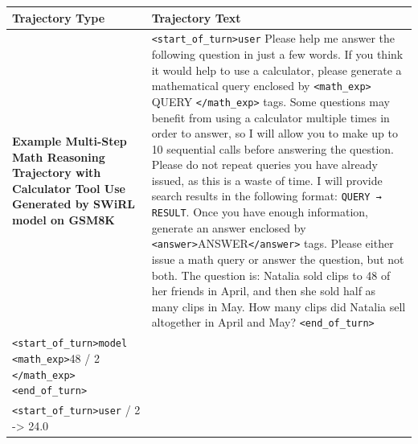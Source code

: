 \documentclass{article} %
\begin{document}
\begin{table}[h!]
    \centering
    \small %
    \begin{tabular}{|p{5cm}|p{8cm}|} %
        \hline
        \textbf{Trajectory Type} & \textbf{Trajectory Text} \\
        \hline
        \textbf{Example Multi-Step Math Reasoning Trajectory with Calculator Tool Use Generated by SWiRL model on GSM8K} & 
        \raggedright 
        \texttt{\textless start\_of\_turn\textgreater user} \newline
        Please help me answer the following question in just a few words. If you think it would help to use a calculator, please generate a mathematical query enclosed by  \texttt{\textless math\_exp\textgreater} QUERY \texttt{\textless /math\_exp\textgreater} tags. \newline
        Some questions may benefit from using a calculator multiple times in order to answer, so I will allow you to make up to 10 sequential calls before answering the question.\newline
        Please do not repeat queries you have already issued, as this is a waste of time. \newline
        I will provide search results in the following format: \newline
        \texttt{QUERY → RESULT}. \newline
        Once you have enough information, generate an answer enclosed by \texttt{\textless answer\textgreater}ANSWER\texttt{\textless /answer\textgreater} tags. \newline
        Please either issue a math query or answer the question, but not both. \newline
        The question is: Natalia sold clips to 48 of her friends in April, and then she sold half as many clips in May. How many clips did Natalia sell altogether in April and May? \newline
        \texttt{\textless end\_of\_turn\textgreater} \\
        \texttt{\textless start\_of\_turn\textgreater model} \newline
        \texttt{\textless math\_exp\textgreater}48 / 2 \texttt{\textless /math\_exp\textgreater} \newline
        \texttt{\textless end\_of\_turn\textgreater} \\
        \texttt{\textless start\_of\_turn\textgreater user} \newline
        48 / 2 -> 24.0 \newline

\end{tabular}
\end{table}
\end{document}
